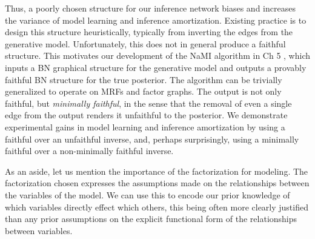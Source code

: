 Thus, a poorly chosen structure for our inference network biases and increases the variance of model learning and inference amortization. Existing practice is to design this structure heuristically, typically from inverting the edges from the generative model. Unfortunately, this does not in general produce a faithful structure. This motivates our development of the NaMI algorithm in Ch 5 \citep{WebbEtAl2018}, which inputs a BN graphical structure for the generative model and outputs a provably faithful BN structure for the true posterior. The algorithm can be trivially generalized to operate on MRFs and factor graphs. The output is not only faithful, but \emph{minimally faithful}, in the sense that the removal of even a single edge from the output renders it unfaithful to the posterior. We demonstrate experimental gains in model learning and inference amortization by using a faithful over an unfaithful inverse, and, perhaps surprisingly, using a minimally faithful over a non-minimally faithful inverse.

As an aside, let us mention the importance of the factorization for modeling. The factorization chosen expresses the assumptions made on the relationships between the variables of the model. We can use this to encode our prior knowledge of which variables directly effect which others, this being often more clearly justified than any prior assumptions on the explicit functional form of the relationships between variables.




